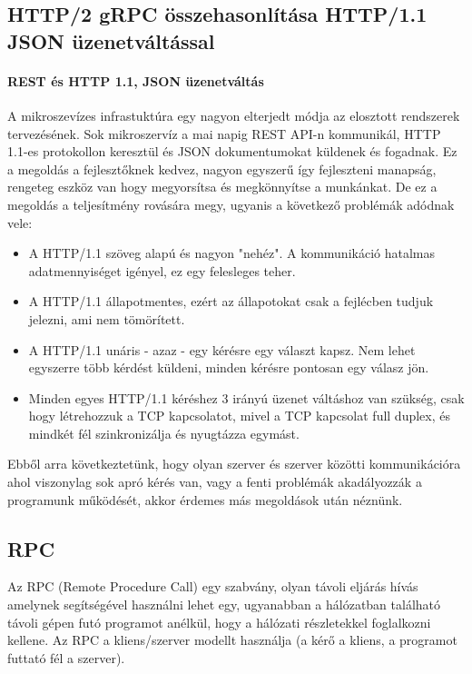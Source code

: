 \subsection{HTTP/2 gRPC összehasonlítása HTTP/1.1 JSON üzenetváltással}

\paragraph{REST és HTTP 1.1, JSON üzenetváltás}
A mikroszevízes infrastuktúra egy nagyon elterjedt módja az elosztott rendszerek tervezésének.
Sok mikroszervíz a mai napig REST API-n kommunikál, HTTP 1.1-es protokollon keresztül és JSON dokumentumokat küldenek és fogadnak.
Ez a megoldás a fejlesztőknek kedvez, nagyon egyszerű így fejleszteni manapság, rengeteg eszköz van hogy megyorsítsa és megkönnyítse a munkánkat.
De ez a megoldás a teljesítmény rovására megy, ugyanis a következő problémák adódnak vele:
\begin{itemize}
    \item A HTTP/1.1  szöveg alapú és nagyon "nehéz". A kommunikáció hatalmas adatmennyiséget igényel, ez egy felesleges teher.
    \item A HTTP/1.1  állapotmentes, ezért az állapotokat csak a fejlécben tudjuk jelezni, ami nem tömörített.
    \item A HTTP/1.1  unáris - azaz - egy kérésre egy választ kapsz. Nem lehet egyszerre több kérdést küldeni, minden kérésre pontosan egy válasz jön.
    \item Minden egyes HTTP/1.1 kéréshez 3 irányú üzenet váltáshoz van szükség, csak hogy létrehozzuk a TCP kapcsolatot, mivel a TCP kapcsolat full duplex, és mindkét fél szinkronizálja és nyugtázza egymást.
\end{itemize}
Ebből arra következtetünk, hogy olyan szerver és szerver közötti kommunikációra ahol viszonylag sok apró kérés van, vagy a fenti problémák
akadályozzák a programunk működését, akkor érdemes más megoldások után néznünk.

\subsection{RPC}
Az RPC \cite{RPC} (Remote Procedure Call) egy szabvány, olyan távoli eljárás hívás amelynek segítségével használni lehet egy, ugyanabban a hálózatban található távoli gépen futó programot anélkül, hogy a hálózati részletekkel foglalkozni kellene.
Az RPC a kliens/szerver modellt használja (a kérő a kliens, a programot futtató fél a szerver).

